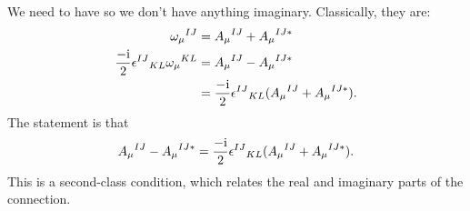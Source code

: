We need to have  so we don't have anything
imaginary. Classically, they are:
\begin{subequations}
\begin{align}
{\omega_{\mu}}^{IJ} &= {A_{\mu}}^{IJ} + {A_{\mu}}^{IJ*}\\
\frac{-\mathrm{i}}{2}{\epsilon^{IJ}}_{KL}{\omega_{\mu}}^{KL}
&={A_{\mu}}^{IJ} - {A_{\mu}}^{IJ*}\\
&=\frac{-\mathrm{i}}{2}{\epsilon^{IJ}}_{KL}({A_{\mu}}^{IJ} + {A_{\mu}}^{IJ*}).
\end{align}
\end{subequations}
The statement is that
\begin{equation}
{A_{\mu}}^{IJ} - {A_{\mu}}^{IJ*} = \frac{-\mathrm{i}}{2}{\epsilon^{IJ}}_{KL}({A_{\mu}}^{IJ} + {A_{\mu}}^{IJ*}).
\end{equation}
This is a second-class condition, which relates the real and imaginary
parts of the connection.


